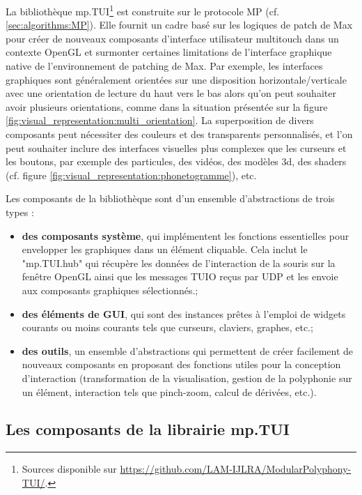 La bibliothèque mp.TUI\footnote{Sources disponible sur \url{https://github.com/LAM-IJLRA/ModularPolyphony-TUI/}.} est construite sur le protocole MP (cf. \ref{sec:algorithms:MP}). Elle fournit un cadre basé sur les logiques de patch de Max pour créer de nouveaux composants d'interface utilisateur multitouch dans un contexte OpenGL et surmonter certaines limitations de l'interface graphique native de l'environnement de patching de Max. Par exemple, les interfaces graphiques sont généralement orientées sur une disposition horizontale/verticale avec une orientation de lecture du haut vers le bas alors qu'on peut souhaiter avoir plusieurs orientations, comme dans la situation présentée sur la figure \ref{fig:visual_representation:multi_orientation}. La superposition de divers composants peut nécessiter des couleurs et des transparents personnalisés, et l'on peut souhaiter inclure des interfaces visuelles plus complexes que les curseurs et les boutons, par exemple des particules, des vidéos, des modèles 3d, des shaders (cf. figure \ref{fig:visual_representation:phonetogramme}), etc.

Les composants de la bibliothèque sont d'un ensemble d'abstractions de trois types :
\vspace{-1em}
\begin{itemize}[noitemsep]
	\item \textbf{des composants système}, qui implémentent les fonctions essentielles pour envelopper les graphiques dans un élément cliquable. Cela inclut le "mp.TUI.hub" qui récupère les données de l'interaction de la souris sur la fenêtre OpenGL ainsi que les messages TUIO reçus par UDP et les envoie aux composants graphiques sélectionnés.;
	\item \textbf{des éléments de GUI}, qui sont des instances prêtes à l'emploi de widgets courants ou moins courants tels que curseurs, claviers, graphes, etc.;
	\item \textbf{des outils}, un ensemble d'abstractions qui permettent de créer facilement de nouveaux composants en proposant des fonctions utiles pour la conception d'interaction (transformation de la visualisation, gestion de la polyphonie sur un élément, interaction tels que pinch-zoom, calcul de dérivées, etc.).
\end{itemize}

\subsection{Les composants de la librairie mp.TUI}

